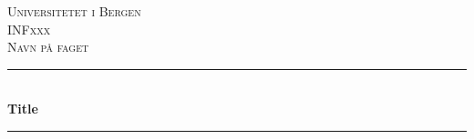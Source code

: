 \begin{titlepage}


\newcommand{\HRule}{\rule{\linewidth}{0.5mm}} %

\center %
 

\textsc{\LARGE Universitetet i Bergen}\\[1.5cm] %
\textsc{\Large INFxxx}\\[0.5cm] %
\textsc{\large Navn på faget}\\[0.5cm] %


\HRule \\[0.4cm]
{ \huge \bfseries Title}\\[0.4cm] %
\HRule \\[1.5cm]
 

\end{titlepage}

